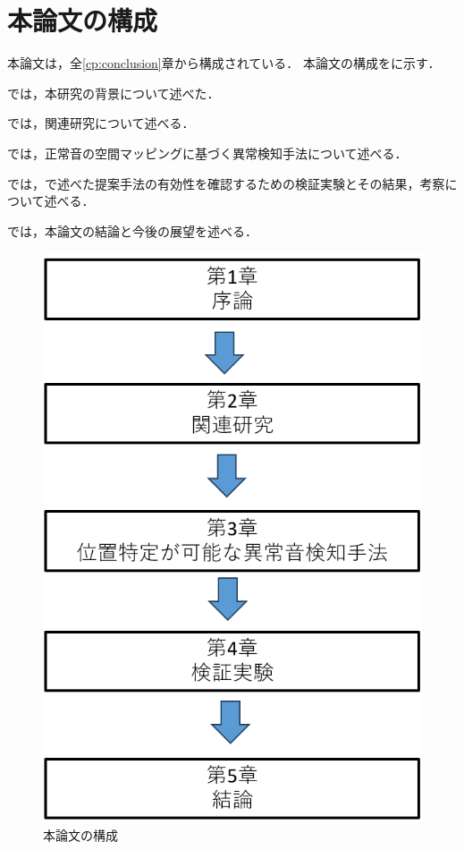 \documentclass[../main]{subfiles}
\begin{document}
\section{本論文の構成}
\label{sec:configuration}
本論文は，全\ref{cp:conclusion}章から構成されている．
本論文の構成をに示す．

では，本研究の背景について述べた．

では，関連研究について述べる．

では，正常音の空間マッピングに基づく異常検知手法について述べる．

では，で述べた提案手法の有効性を確認するための検証実験とその結果，考察について述べる．

では，本論文の結論と今後の展望を述べる．

\vspace{3\zh}
\begin{figure}[h]
  \centering
  \includegraphics[keepaspectratio, width=0.5\linewidth]{chap1/configuration.png}
  \caption{本論文の構成}
  \label{fig:configuration}
\end{figure}
\end{document}
